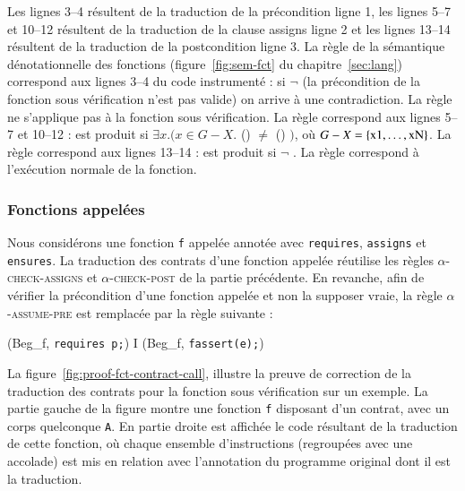 Les lignes 3--4 résultent de la traduction de la précondition ligne 1,
les lignes 5--7 et 10--12 résultent de la traduction de la clause assigns ligne
2 et les lignes 13--14 résultent de la traduction de la postcondition ligne 3.
La règle  de la sémantique dénotationnelle des fonctions
(figure~\ref{fig:sem-fct} du chapitre~\ref{sec:lang}) correspond aux lignes
3--4 du code instrumenté :
si $\lnot$  (la précondition de la fonction sous
vérification n'est pas valide) on arrive à une contradiction.
La règle  ne s'applique pas à la fonction sous vérification.
La règle  correspond aux lignes 5--7 et 10--12 : \errorenv est
produit si $\exists x. (x \in G-X.$
() $\ne$ ()
$)$,
où $G-X = \{\mbox{\lstinline'x1'},\ldots,\mbox{\lstinline'xN'}\}$.
La règle  correspond aux lignes 13--14 : \errorenv est produit
si $\lnot$ .
La règle  correspond à l'exécution normale de la fonction.


\subsubsection{Fonctions appelées}

Nous considérons une fonction \lstinline'f' appelée annotée avec
\lstinline'requires', \lstinline'assigns' et \lstinline'ensures'.
La traduction des contrats d'une fonction appelée réutilise les règles
\textsc{$\alpha$-check-assigns} et \textsc{$\alpha$-check-post} de la partie
précédente.
En revanche, afin de vérifier la précondition d'une fonction appelée et non la
supposer vraie, la règle \textsc{$\alpha$-assume-pre} est remplacée par la règle
suivante :

{\scriptsize
  {
    {(Beg_f, \mbox{\lstinline'requires p;'})
      I \concat (Beg_f, \mbox{\lstinline'fassert(e);'})}
  }
}

La figure~\ref{fig:proof-fct-contract-call}, illustre la preuve de correction
de la traduction des contrats pour la fonction sous vérification sur un exemple.
La partie gauche de la figure montre une fonction \lstinline'f' disposant d'un
contrat, avec un corps quelconque \lstinline'A'.
En partie droite est affichée le code résultant de la traduction de cette
fonction, où chaque ensemble d'instructions (regroupées avec une accolade) est
mis en relation avec l'annotation du programme original dont il est la
traduction.

